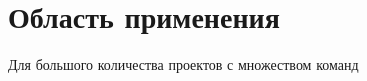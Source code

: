 \section{Область применения}
\label{sec:appl-area}

Для большого количества проектов с множеством команд
